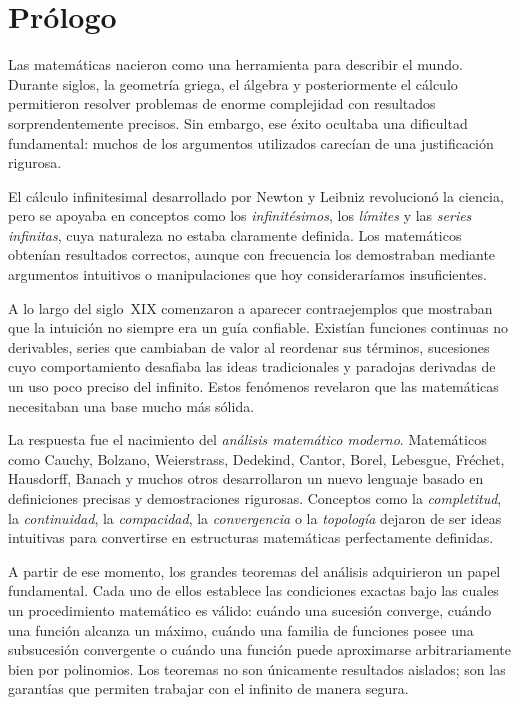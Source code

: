 \chapter*{Prólogo}

Las matemáticas nacieron como una herramienta para describir el mundo. Durante siglos, la geometría griega, el álgebra y posteriormente el cálculo permitieron resolver problemas de enorme complejidad con resultados sorprendentemente precisos. Sin embargo, ese éxito ocultaba una dificultad fundamental: muchos de los argumentos utilizados carecían de una justificación rigurosa.

El cálculo infinitesimal desarrollado por Newton y Leibniz revolucionó la ciencia, pero se apoyaba en conceptos como los \emph{infinitésimos}, los \emph{límites} y las \emph{series infinitas}, cuya naturaleza no estaba claramente definida. Los matemáticos obtenían resultados correctos, aunque con frecuencia los demostraban mediante argumentos intuitivos o manipulaciones que hoy consideraríamos insuficientes.

A lo largo del siglo~XIX comenzaron a aparecer contraejemplos que mostraban que la intuición no siempre era un guía confiable. Existían funciones continuas no derivables, series que cambiaban de valor al reordenar sus términos, sucesiones cuyo comportamiento desafiaba las ideas tradicionales y paradojas derivadas de un uso poco preciso del infinito. Estos fenómenos revelaron que las matemáticas necesitaban una base mucho más sólida.

La respuesta fue el nacimiento del \emph{análisis matemático moderno}. Matemáticos como Cauchy, Bolzano, Weierstrass, Dedekind, Cantor, Borel, Lebesgue, Fréchet, Hausdorff, Banach y muchos otros desarrollaron un nuevo lenguaje basado en definiciones precisas y demostraciones rigurosas. Conceptos como la \emph{completitud}, la \emph{continuidad}, la \emph{compacidad}, la \emph{convergencia} o la \emph{topología} dejaron de ser ideas intuitivas para convertirse en estructuras matemáticas perfectamente definidas.

A partir de ese momento, los grandes teoremas del análisis adquirieron un papel fundamental. Cada uno de ellos establece las condiciones exactas bajo las cuales un procedimiento matemático es válido: cuándo una sucesión converge, cuándo una función alcanza un máximo, cuándo una familia de funciones posee una subsucesión convergente o cuándo una función puede aproximarse arbitrariamente bien por polinomios. Los teoremas no son únicamente resultados aislados; son las garantías que permiten trabajar con el infinito de manera segura.

